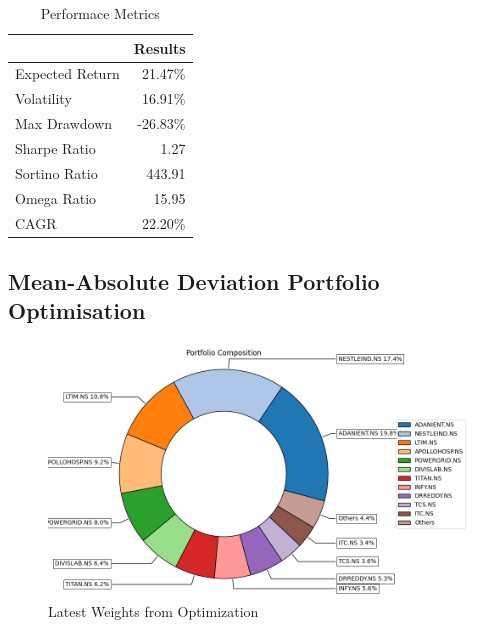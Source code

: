  \begin{table}[H]

    \centering %
    \label{tab:performance_metrics}
    
    \caption{Performace Metrics}
    \vspace{5mm} %

\begin{tabular}{lr}
\toprule
 & Results \\
\midrule
Expected Return & 21.47\% \\
Volatility & 16.91\% \\
Max Drawdown & -26.83\% \\
Sharpe Ratio & 1.27 \\
Sortino Ratio & 443.91 \\
Omega Ratio & 15.95 \\
CAGR & 22.20\% \\
\bottomrule
\end{tabular}
\end{table}

\subsection{Mean-Absolute Deviation Portfolio Optimisation}

\begin{figure}[H]
   \centering
   \includegraphics[width=1\linewidth]{images/MAD/Weights.png}
   \caption{Latest Weights from Optimization}
   \label{fig:network_architecture1}
 \end{figure}

